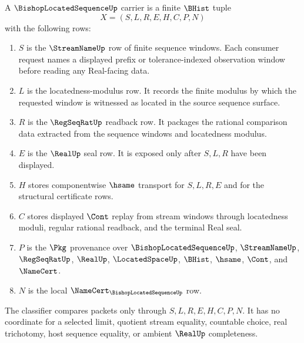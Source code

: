 \begin{definition}
\label{def:bishop-located-sequence-carrier}
A $\BishopLocatedSequenceUp$ carrier is a finite $\BHist$ tuple
$$
X=(S,L,R,E,H,C,P,N)
$$
with the following rows:
\begin{enumerate}
\item $S$ is the $\StreamNameUp$ row of finite sequence windows. Each consumer request names a displayed prefix or tolerance-indexed observation window before reading any Real-facing data.
\item $L$ is the locatedness-modulus row. It records the finite modulus by which the requested window is witnessed as located in the source sequence surface.
\item $R$ is the $\RegSeqRatUp$ readback row. It packages the rational comparison data extracted from the sequence windows and locatedness modulus.
\item $E$ is the $\RealUp$ seal row. It is exposed only after $S,L,R$ have been displayed.
\item $H$ stores componentwise $\hsame$ transport for $S,L,R,E$ and for the structural certificate rows.
\item $C$ stores displayed $\Cont$ replay from stream windows through locatedness moduli, regular rational readback, and the terminal Real seal.
\item $P$ is the $\Pkg$ provenance over $\BishopLocatedSequenceUp$, $\StreamNameUp$, $\RegSeqRatUp$, $\RealUp$, $\LocatedSpaceUp$, $\BHist$, $\hsame$, $\Cont$, and $\NameCert$.
\item $N$ is the local $\NameCert_{\BishopLocatedSequenceUp}$ row.
\end{enumerate}
The classifier compares packets only through $S,L,R,E,H,C,P,N$. It has no coordinate for a selected limit, quotient stream equality, countable choice, real trichotomy, host sequence equality, or ambient $\RealUp$ completeness.
\end{definition}

